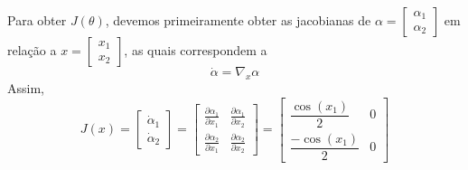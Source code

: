 Para obter $J(\theta)$, devemos primeiramente obter as jacobianas de $\alpha = \begin{bmatrix}\alpha_1\\\alpha_2\end{bmatrix}$ em relação a $x = \begin{bmatrix}x_1\\x_2\end{bmatrix}$, as quais correspondem a
\begin{equation*}
\dot{\alpha} = \nabla_x\alpha
\end{equation*}
Assim,
\begin{equation*}
J(x) = \begin{bmatrix}\dot{\alpha}_1\\\dot{\alpha}_2\end{bmatrix}= \begin{bmatrix}\frac{\partial \alpha_1}{\partial x_1}&\frac{\partial \alpha_1}{\partial x_2}\\\frac{\partial \alpha_2}{\partial x_1}&\frac{\partial \alpha_2}{\partial x_2}\end{bmatrix}
= \begin{bmatrix}\dfrac{\cos(x_1)}{2}&0\\\dfrac{-\cos(x_1)}{2}&0\end{bmatrix}
\end{equation*}

